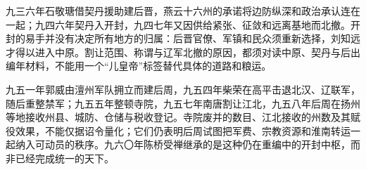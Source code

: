 九三六年石敬瑭借契丹援助建后晋，燕云十六州的承诺将边防纵深和政治承认连在一起；九四六年契丹入开封，九四七年又因供给紧张、征敛和远离基地而北撤。开封的易手并没有决定所有地方的归属：后晋官僚、军镇和民众须重新选择，刘知远才得以进入中原。割让范围、称谓与辽军北撤的原因，都须对读中原、契丹与后出编年材料，不能用一个“儿皇帝”标签替代具体的道路和粮运。

九五一年郭威由澶州军队拥立而建后周，九五四年柴荣在高平击退北汉、辽联军，随后重整禁军；九五五年整顿寺院，九五七年南唐割让江北，九五八年后周在扬州等地接收州县、城防、仓储与税收登记。寺院废并的数目、江北接收的州数及其赋役效果，不能仅据诏令量化；它们仍表明后周试图把军费、宗教资源和淮南转运一起纳入可动员的秩序。九六〇年陈桥受禅继承的是这种仍在重编中的开封中枢，而非已经完成统一的天下。
